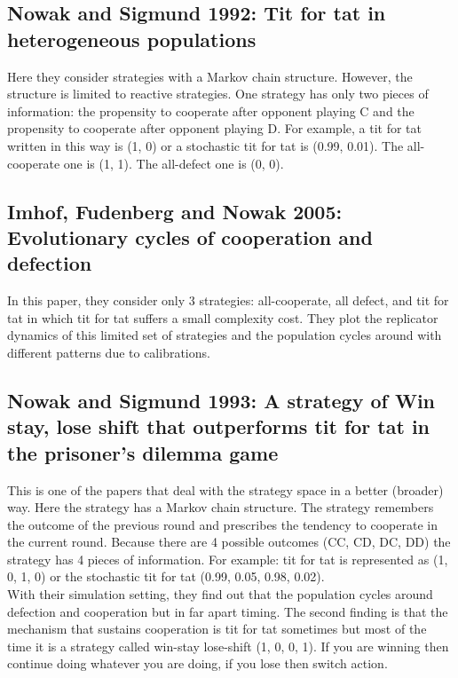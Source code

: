 \documentclass[12.5pt]{report}
\begin{document}
\subsection{Nowak and Sigmund 1992: Tit for tat in heterogeneous populations}
Here they consider strategies with a Markov chain structure. However, the structure is limited to reactive strategies. One strategy has only two pieces of information: the propensity to cooperate after opponent playing C and the propensity to cooperate after opponent playing D. For example, a tit for tat written in this way is (1, 0) or a stochastic tit for tat is (0.99, 0.01). The all-cooperate one is (1, 1). The all-defect one is (0, 0). 

\subsection{Imhof, Fudenberg and Nowak 2005: Evolutionary cycles of cooperation and defection}
In this paper, they consider only 3 strategies: all-cooperate, all defect, and tit for tat in which tit for tat suffers a small complexity cost. They plot the replicator dynamics of this limited set of strategies and the population cycles around with different patterns due to calibrations.

\subsection{Nowak and Sigmund 1993: A strategy of Win stay, lose shift that outperforms tit for tat in the prisoner’s dilemma game}

This is one of the papers that deal with the strategy space in a better (broader) way. Here the strategy has a Markov chain structure. The strategy remembers the outcome of the previous round and prescribes the tendency to cooperate in the current round. Because there are 4 possible outcomes (CC, CD, DC, DD) the strategy has 4 pieces of information. For example: tit for tat is represented as (1, 0, 1, 0) or the stochastic tit for tat (0.99, 0.05, 0.98, 0.02). \\

With their simulation setting, they find out that the population cycles around defection and cooperation but in far apart timing. The second finding is that the mechanism that sustains cooperation is tit for tat sometimes but most of the time it is a strategy called win-stay lose-shift (1, 0, 0, 1). If you are winning then continue doing whatever you are doing, if you lose then switch action.\\
\end{document}
